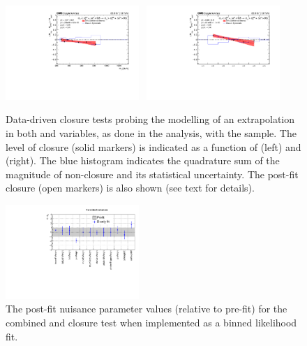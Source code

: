 \begin{figure}[h!]
  \begin{center}
    \includegraphics[width=0.45\textwidth]{figures/closureTests/AlphaT_bDPhi/SingleMu_alphaTbdphi_ht.pdf}~
    \includegraphics[width=0.45\textwidth]{figures/closureTests/AlphaT_bDPhi/SingleMu_alphaTbdphi_nJet.pdf}\\
    \caption{Data-driven closure tests probing the modelling of an
      extrapolation in both \alphat and \bdphi variables, as done in
      the analysis, with the \mj sample. The level of closure (solid
      markers) is indicated as a function of \scalht (left) and \njet
      (right). The blue histogram indicates the quadrature sum of the
      magnitude of non-closure and its statistical uncertainty. The
      post-fit closure (open markers) is also shown (see text for
      details).  }
    \label{fig:closure_AlphaT_bDPhi_mu}
  \end{center} 
\end{figure}

\begin{figure}[h!]
  \begin{center}
    \includegraphics[width=0.45\textwidth]{figures/closureTests/AlphaT/AlphaT_Correlated_nuisances.pdf}
    \caption{The post-fit nuisance parameter values (relative to
      pre-fit) for the combined \alphat and \bdphi closure test when
      implemented as a binned likelihood fit. } 
    \label{fig:closure_AlphaT_bDPhi_LH_mu}
  \end{center} 
\end{figure}

